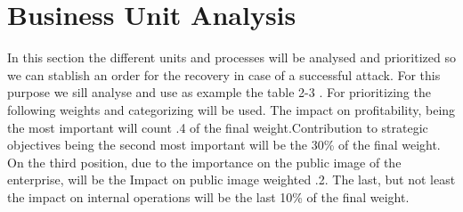 \section{Business Unit Analysis}
In this section the different units and processes will be analysed and prioritized so we can stablish an order for the recovery in case of a successful attack. For this purpose we sill analyse and use as example the table 2-3 \cite{whitman3}. For prioritizing the following weights and categorizing will be used. The impact on profitability, being the most important will count .4 of the final weight.Contribution to strategic objectives being the second most important will be the 30\% of the final weight. On the third position, due to the importance on the public image of the enterprise, will be the Impact on public image weighted .2. The last, but not least the impact on internal operations will be the last 10\% of the final weight.

